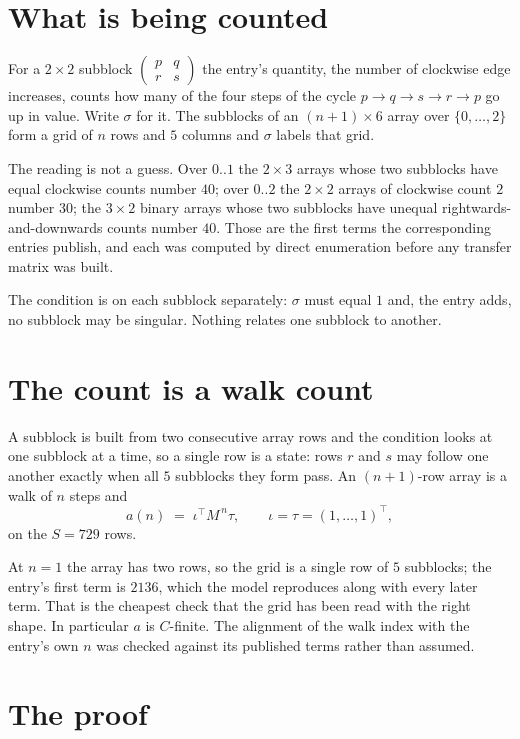 \documentclass[11pt,a4paper]{article}
\theoremstyle{plain}
\theoremstyle{definition}
\begin{document}
\section{What is being counted}

For a $2\times2$ subblock $\begin{pmatrix}p&q\\r&s\end{pmatrix}$ the
entry's quantity, the number of clockwise edge increases, counts how many of the four steps of the cycle $p\to q\to s\to r\to p$ go up in value. Write $\sigma$ for it. The subblocks of an
$(n+1)\times6$ array over $\{0,\dots,2\}$ form a grid of $n$ rows and $5$
columns and $\sigma$ labels that grid.

The reading is not a guess. Over $0..1$ the $2\times3$ arrays whose two subblocks have equal
clockwise counts number $40$; over $0..2$ the $2\times2$ arrays of clockwise count $2$ number
$30$; the $3\times2$ binary arrays whose two subblocks have unequal rightwards-and-downwards
counts number $40$. Those are the first terms the corresponding entries publish, and each was
computed by direct enumeration before any transfer matrix was built.

The condition is on each subblock separately: $\sigma$ must equal $1$ and, the entry adds, no subblock may be singular. Nothing
relates one subblock to another.

\section{The count is a walk count}

A subblock is built from two consecutive array rows and the condition looks
at one subblock at a time, so a single row is a state: rows $r$ and $s$ may follow one another
exactly when all $5$ subblocks they form pass. An $(n+1)$-row array is a walk of $n$ steps and
\[
a(n)\;=\;\iota^{\!\top}M^{\,n}\tau,\qquad\iota=\tau=(1,\dots,1)^{\!\top},
\]
on the $S=729$ rows.

At $n=1$ the array has two rows, so the grid is a single row of $5$
subblocks; the entry's first term is $2136$, which the model
reproduces along with every later term. That is the cheapest check that the grid has been read
with the right shape.
In particular $a$ is $C$-finite. The alignment of the walk index with the entry's own $n$ was
checked against its published terms rather than assumed.

\section{The proof}
\end{document}

